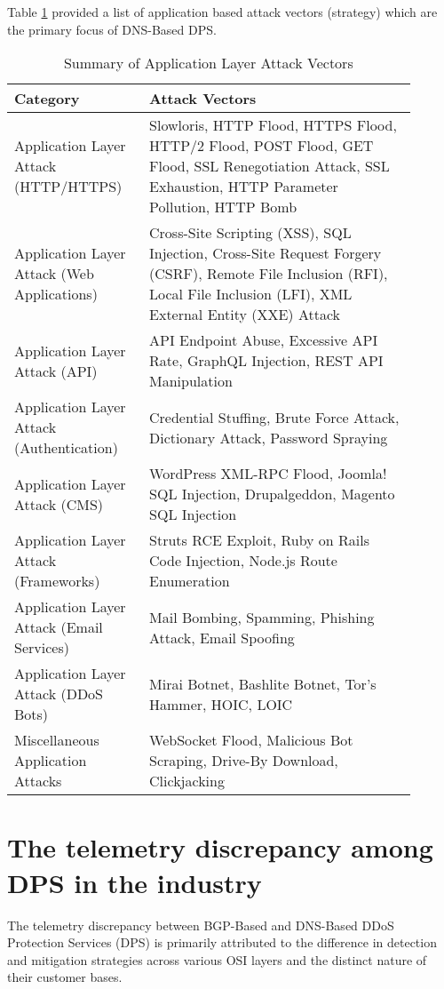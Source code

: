 Table \ref{tab:application_attacks} provided a list of application based attack vectors (strategy) \cite{zolotukhin2018data} which are the primary focus of DNS-Based DPS.

\begin{table}[!htbp]
\centering
\caption{Summary of Application Layer Attack Vectors}
\begin{tabular}{|p{0.3\linewidth}|p{0.6\linewidth}|}
\hline
\textbf{Category} & \textbf{Attack Vectors} \\
\hline
Application Layer Attack (HTTP/HTTPS) & Slowloris, HTTP Flood, HTTPS Flood, HTTP/2 Flood, POST Flood, GET Flood, SSL Renegotiation Attack, SSL Exhaustion, HTTP Parameter Pollution, HTTP Bomb \\
\hline
Application Layer Attack (Web Applications) & Cross-Site Scripting (XSS), SQL Injection, Cross-Site Request Forgery (CSRF), Remote File Inclusion (RFI), Local File Inclusion (LFI), XML External Entity (XXE) Attack \\
\hline
Application Layer Attack (API) & API Endpoint Abuse, Excessive API Rate, GraphQL Injection, REST API Manipulation \\
\hline
Application Layer Attack (Authentication) & Credential Stuffing, Brute Force Attack, Dictionary Attack, Password Spraying \\
\hline
Application Layer Attack (CMS) & WordPress XML-RPC Flood, Joomla! SQL Injection, Drupalgeddon, Magento SQL Injection \\
\hline
Application Layer Attack (Frameworks) & Struts RCE Exploit, Ruby on Rails Code Injection, Node.js Route Enumeration \\
\hline
Application Layer Attack (Email Services) & Mail Bombing, Spamming, Phishing Attack, Email Spoofing \\
\hline
Application Layer Attack (DDoS Bots) & Mirai Botnet, Bashlite Botnet, Tor's Hammer, HOIC, LOIC \\
\hline
Miscellaneous Application Attacks & WebSocket Flood, Malicious Bot Scraping, Drive-By Download, Clickjacking \\
\hline
\end{tabular}
\label{tab:application_attacks}
\end{table}


\section{The telemetry discrepancy among DPS in the industry}\label{sec:telemetry}
The telemetry discrepancy between BGP-Based and DNS-Based DDoS Protection Services (DPS) is primarily attributed to the difference in detection and mitigation strategies across various OSI layers and the distinct nature of their customer bases. 
